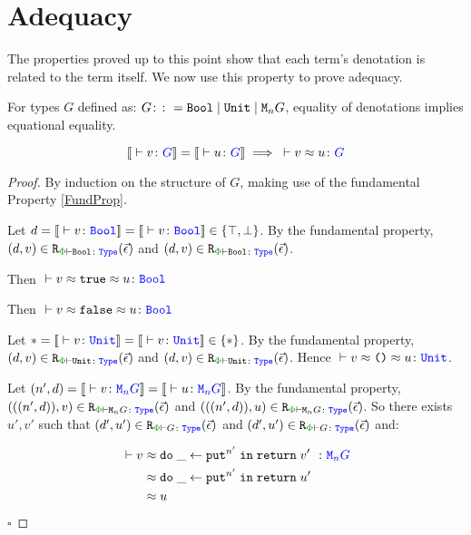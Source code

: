\section{Adequacy}
\label{AdequacySection}

The properties proved up to this point show that each term's denotation is related to the term itself. We now use this property to prove adequacy.

\begin{framed}
    
    \begin{theorem}[Adequacy]
        For types $G$ defined as: $ G\colon\colon= \texttt{Bool} \mid \texttt{Unit} \mid \texttt{M}_{n}{G}$, equality of denotations implies equational equality.
        
        \begin{equation}
            \deno{\ztyperelation{v}{G}} = \deno{\ztyperelation{u}{G}} \implies \zberelation{v}{u}{G}
        \end{equation}
        
    \end{theorem}
        
        \begin{proof}
            By induction on the structure of $G$, making use of the fundamental Property \ref{FundProp}.
        

            Let $d=\deno{\ztyperelation{v}{\B}}=\deno{\ztyperelation{v}{\B}}\in \{ \top, \bot\}$. By the fundamental property, $\inLogRelPE{d}{v}{\B}$  and $\inLogRelPE{d}{v}{\B}$.
        
            Then $\zberelation{v\beequiv\t}{u}{\B}$
        
            
            Then $\zberelation{v\beequiv\f}{u}{\B}$
        

            Let $\singleton=\deno{\ztyperelation{v}{\U}}=\deno{\ztyperelation{v}{\U}}\in \{\singleton\}$. By the fundamental property, $\inLogRelPE{d}{v}{\U}$  and $\inLogRelPE{d}{v}{\U}$. Hence $\zberelation{v\beequiv\u}{u}{\U}$.
        
            \case{\teffect}
        
            Let $( n',  d) = \deno{\ztyperelation{v}{\M{n}{G}}} = \deno{\ztyperelation{u}{\M{n}{G}}}$. By the fundamental property, $\inLogRelPE{((n', d))}{v}{\M{n}{G}}$ and $\inLogRelPE{((n', d))}{u}{\M{n}{G}}$. So there exists $u', v'$ such that $\inLogRelPE{d'}{u'}{G}$ and $\inLogRelPE{d'}{u'}{G}$ and:
        
            \begin{align*}
                \zberelation{v&}{\doin{\_}{\put^{n'}}{\return{v'}}}{\M{n}{G}}\\
                &\beequiv \doin{\_}{\put^{n'}}{\return{u'}}\\
                & \beequiv u
            \end{align*}
        $\square$
        \end{proof}
\end{framed}
